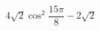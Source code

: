 \begin{ex}[type=type=expression]
	\begin{condition}
		\( 4\sqrt{2}\cos^2\dfrac{15\pi}{8}-2\sqrt{2} \)
	\end{condition}
\end{ex}